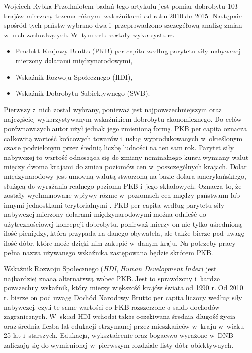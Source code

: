 \begin{artplenv}{Wojciech Rybka}
Przedmiotem badań tego artykułu jest pomiar dobrobytu 103 krajów mierzony trzema różnymi wskaźnikami od roku 2010 do
2015. Następnie spośród tych państw wybrano dwa i~przeprowadzono szczegółową analizę zmian w~nich zachodzących.
W~tym celu zostały wykorzystane: 

\begin{itemize}
\item Produkt Krajowy Brutto (PKB) per capita według parytetu siły nabywczej mierzony dolarami międzynarodowymi,
\item Wskaźnik Rozwoju Społecznego (HDI),
\item Wskaźnik Dobrobytu Subiektywnego (SWB).
\end{itemize}

Pierwszy z~nich został wybrany, ponieważ jest najpowszechniejszym oraz najczęściej wykorzystywanym wskaźnikiem dobrobytu
ekonomicznego. Do celów porównawczych autor użył jednak jego zmienioną formę. PKB per capita oznacza całkowitą wartość
końcowych towarów i~usług wyprodukowanych w~określonym czasie podzielonym przez średnią liczbę ludności na ten sam rok.
Parytet siły nabywczej to wartość odnosząca się do zmiany nominalnego kursu wymiany walut między dwoma krajami do zmian
poziomów cen w~poszczególnych krajach. Dolar międzynarodowy jest umowną walutą stworzoną na bazie dolara
amerykańskiego, służącą do wyrażania realnego poziomu PKB i~jego składowych. Oznacza to, że zostały wyeliminowane
wpływy różnic w~poziomach cen między państwami lub innymi jednostkami terytorialnymi
\parencite{international_monetary_fund_world_2019a}.
PKB per capita według parytetu siły nabywczej mierzony
dolarami międzynarodowymi można odnieść do użytecznościowej koncepcji dobrobytu, ponieważ mierzy on nie tylko
uśrednioną ilość pieniędzy, która przypada na danego obywatela, ale także bierze pod uwagę ilość dóbr, które może
dzięki nim zakupić w~danym kraju. Na potrzeby pracy pełna nazwa używanego wskaźnika zastępowana będzie skrótem PKB.

Wskaźnik Rozwoju Społecznego (\textit{HDI}, \textit{Human Development Index}) jest najbardziej znaną alternatywą wobec
PKB. Jest to sprawdzony i~bardzo powszechny wskaźnik, który mierzy większość krajów świata od 1990 r. Od 2010 r. bierze
on pod uwagę Dochód Narodowy Brutto per capita liczony według siły nabywczej, czyli te same wartości co PKB rozszerzone
o saldo dochodów zagranicznych. W~skład HDI wchodzi także oczekiwana średnia długość życia oraz średnia liczba lat
edukacji otrzymanej przez mieszkańców w~kraju w~wieku 25 lat i~starszych. Edukacja, wykształcenie oraz bogactwo
wyrażone w~DNB zaliczają się do wymienionej w~pierwszym rozdziale listy dóbr obiektywnych.


\end{artplenv}
